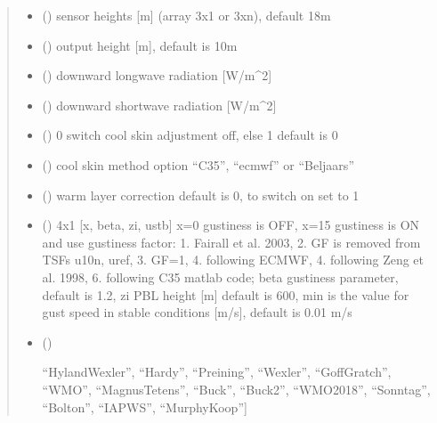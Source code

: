 \documentclass[letterpaper,10pt,english]{sphinxmanual}
\begin{document}
\begin{fulllineitems}
\begin{quote}
\begin{description}
\begin{itemize}
\item {} 
\sphinxAtStartPar
{} () \textendash{} sensor heights {[}m{]} (array 3x1 or 3xn), default 18m

\item {} 
\sphinxAtStartPar
{} () \textendash{} output height {[}m{]}, default is 10m

\item {} 
\sphinxAtStartPar
{} () \textendash{} downward longwave radiation {[}W/m\textasciicircum{}2{]}

\item {} 
\sphinxAtStartPar
{} () \textendash{} downward shortwave radiation {[}W/m\textasciicircum{}2{]}

\item {} 
\sphinxAtStartPar
{} () \textendash{} 0 switch cool skin adjustment off, else 1
default is 0

\item {} 
\sphinxAtStartPar
{} () \textendash{} cool skin method option “C35”, “ecmwf” or “Beljaars”

\item {} 
\sphinxAtStartPar
{} () \textendash{} warm layer correction default is 0, to switch on set to 1

\item {} 
\sphinxAtStartPar
{} () \textendash{} 4x1 {[}x, beta, zi, ustb{]} x=0 gustiness is OFF, x=1\sphinxhyphen{}5 gustiness is ON
and use gustiness factor: 1. Fairall et al. 2003, 2. GF is removed
from TSFs u10n, uref, 3. GF=1, 4. following ECMWF,
4. following Zeng et al. 1998, 6. following C35 matlab code;
beta gustiness parameter, default is 1.2,
zi PBL height {[}m{]} default is 600,
min is the value for gust speed in stable conditions {[}m/s{]},
default is 0.01 m/s

\item {} 
\sphinxAtStartPar
{} () \textendash{} \begin{description}
\sphinxlineitem{is the saturation evaporation method to use amongst {[}}
\sphinxAtStartPar
“HylandWexler”, “Hardy”, “Preining”, “Wexler”,
“GoffGratch”, “WMO”, “MagnusTetens”, “Buck”,
“Buck2”, “WMO2018”, “Sonntag”, “Bolton”,
“IAPWS”, “MurphyKoop”{]}


\end{description}
\end{itemize}
\end{description}
\end{quote}
\end{fulllineitems}
\end{document}

